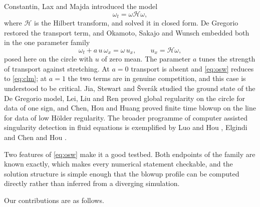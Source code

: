 \documentclass[11pt]{article}
\theoremstyle{definition}
\newcommand{\Hil}{\mathcal{H}}
\begin{document}
Constantin, Lax and Majda \cite{clm1985} introduced the model
\begin{equation}
  \omega_t = \omega \Hil\omega,
  \label{eq:clm}
\end{equation}
where $\Hil$ is the Hilbert transform, and solved it in closed form. De Gregorio
\cite{degregorio1990} restored the transport term, and Okamoto, Sakajo and
Wunsch \cite{osw2008} embedded both in the one parameter family
\begin{equation}
  \omega_t + a\, u\, \omega_x = \omega\, u_x, \qquad u_x = \Hil\omega,
  \label{eq:osw}
\end{equation}
posed here on the circle with $u$ of zero mean. The parameter $a$ tunes the
strength of transport against stretching. At $a=0$ transport is absent and
\eqref{eq:osw} reduces to \eqref{eq:clm}; at $a=1$ the two terms are in genuine
competition, and this case is understood to be critical. Jia, Stewart and
\v{S}ver\'{a}k \cite{jss2019} studied the ground state of the De Gregorio model,
Lei, Liu and Ren \cite{llr2020} proved global regularity on the circle for data
of one sign, and Chen, Hou and Huang \cite{chh2021} proved finite time blowup on
the line for data of low H\"{o}lder regularity. The broader programme of
computer assisted singularity detection in fluid equations is exemplified by
Luo and Hou \cite{luohou2014}, Elgindi \cite{elgindi2021} and Chen and Hou
\cite{chenhou2022}.

Two features of \eqref{eq:osw} make it a good testbed. Both endpoints of the
family are known exactly, which makes every numerical statement checkable, and
the solution structure is simple enough that the blowup profile can be computed
directly rather than inferred from a diverging simulation.

Our contributions are as follows.
\end{document}
